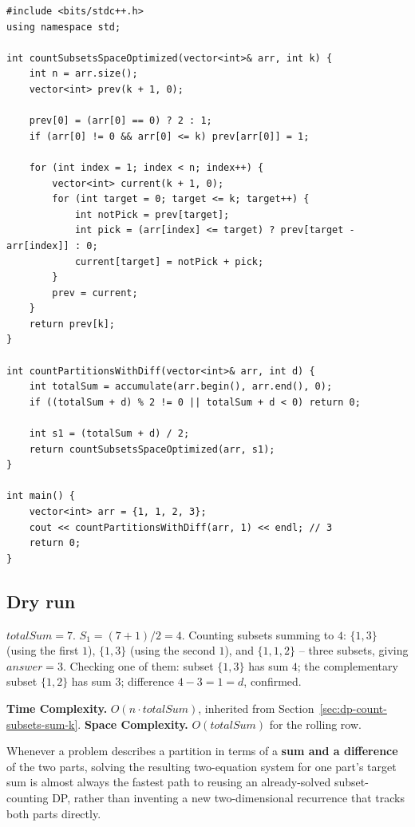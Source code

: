 \begin{lstlisting}
#include <bits/stdc++.h>
using namespace std;

int countSubsetsSpaceOptimized(vector<int>& arr, int k) {
    int n = arr.size();
    vector<int> prev(k + 1, 0);

    prev[0] = (arr[0] == 0) ? 2 : 1;
    if (arr[0] != 0 && arr[0] <= k) prev[arr[0]] = 1;

    for (int index = 1; index < n; index++) {
        vector<int> current(k + 1, 0);
        for (int target = 0; target <= k; target++) {
            int notPick = prev[target];
            int pick = (arr[index] <= target) ? prev[target - arr[index]] : 0;
            current[target] = notPick + pick;
        }
        prev = current;
    }
    return prev[k];
}

int countPartitionsWithDiff(vector<int>& arr, int d) {
    int totalSum = accumulate(arr.begin(), arr.end(), 0);
    if ((totalSum + d) % 2 != 0 || totalSum + d < 0) return 0;

    int s1 = (totalSum + d) / 2;
    return countSubsetsSpaceOptimized(arr, s1);
}

int main() {
    vector<int> arr = {1, 1, 2, 3};
    cout << countPartitionsWithDiff(arr, 1) << endl; // 3
    return 0;
}
\end{lstlisting}

\subsection*{Dry run}


$\textit{totalSum}=7$. $S_1 = (7+1)/2 = 4$. Counting subsets summing to
$4$: $\{1,3\}$ (using the first $1$), $\{1,3\}$ (using the second $1$),
and $\{1,1,2\}$ -- three subsets, giving $\textit{answer}=3$. Checking
one of them: subset $\{1,3\}$ has sum $4$; the complementary subset
$\{1,2\}$ has sum $3$; difference $4-3=1=d$, confirmed.

\begin{complexitybox}
\textbf{Time Complexity.} $O(n \cdot \textit{totalSum})$, inherited
from Section~\ref{sec:dp-count-subsets-sum-k}.
\textbf{Space Complexity.} $O(\textit{totalSum})$ for the rolling row.
\end{complexitybox}

\begin{takeawaybox}
Whenever a problem describes a partition in terms of a \textbf{sum and a
difference} of the two parts, solving the resulting two-equation system
for one part's target sum is almost always the fastest path to reusing
an already-solved subset-counting DP, rather than inventing a new
two-dimensional recurrence that tracks both parts directly.
\end{takeawaybox}
